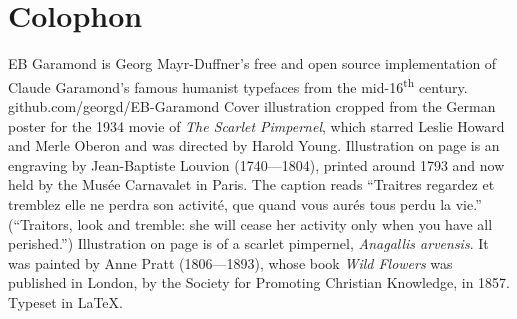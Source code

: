 \documentclass[paper=5.5in:8.5in,BCOR=7mm,twoside,DIV=calc,12pt,usegeometry,chapterprefix,endperiod,headings=big]{scrbook}
\begin{document}
\chapter*{Colophon}

\centering
EB Garamond is Georg Mayr-Duffner's free and open source implementation of Claude Garamond's famous humanist typefaces from the mid-16\textsuperscript{th} century. \\github.com/georgd/EB-Garamond
\vfill
Cover illustration cropped from the German poster for the 1934 movie of \textit{The Scarlet Pimpernel}, which starred Leslie Howard and Merle Oberon and was directed by Harold Young.
\vfill
Illustration on page \pageref{guillotine} is an engraving by Jean-Baptiste Louvion (1740---1804), printed around 1793 and now held by the Musée Carnavalet in Paris. The caption reads \enquote{Traitres regardez et tremblez elle ne perdra son activité, que quand vous aurés tous perdu la vie.} (\enquote{Traitors, look and tremble: she will cease her activity only when you have all perished.})
\vfill
Illustration on page \pageref{flowers} is of a scarlet pimpernel, \textit{Anagallis arvensis}. It was painted by Anne Pratt (1806---1893), whose book \textit{Wild Flowers} was published in London, by the Society for Promoting Christian Knowledge, in 1857. 
\vfill
Typeset in \LaTeX{}.
\thispagestyle{empty}
\end{document}
